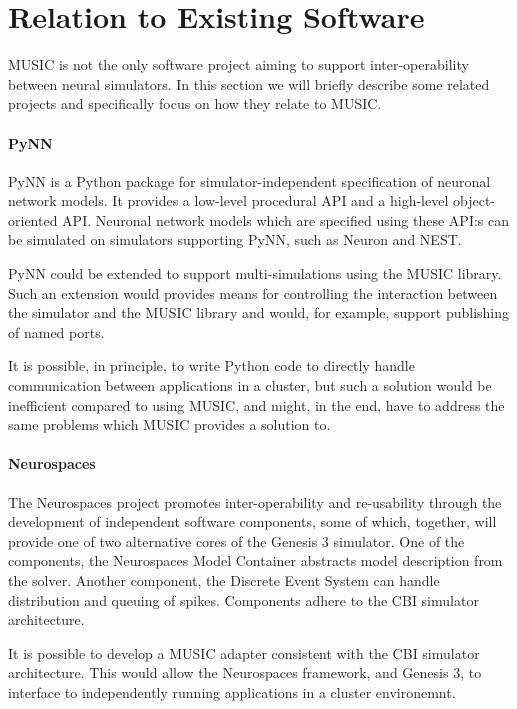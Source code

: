 \documentclass[a4paper]{report}
\begin{document}
\section{Relation to Existing Software}

MUSIC is not the only software project aiming to support
inter-operability between neural simulators.  In this section we will
briefly describe some related projects and specifically focus on how
they relate to MUSIC.

\paragraph{PyNN}

PyNN is a Python package for simulator-independent specification of
neuronal network models.  It provides a low-level procedural API and a
high-level object-oriented API.  Neuronal network models which are
specified using these API:s can be simulated on simulators supporting
PyNN, such as Neuron and NEST.

PyNN could be extended to support multi-simulations using the MUSIC
library.  Such an extension would provides means for controlling the
interaction between the simulator and the MUSIC library and would, for
example, support publishing of named ports.

It is possible, in principle, to write Python code to directly handle
communication between applications in a cluster, but such a solution
would be inefficient compared to using MUSIC, and might, in the end,
have to address the same problems which MUSIC provides a solution to.

\paragraph{Neurospaces}

The Neurospaces project promotes inter-operability and re-usability
through the development of independent software components, some of
which, together, will provide one of two alternative cores of the
Genesis 3 simulator.  One of the components, the Neurospaces Model
Container abstracts model description from the solver.  Another
component, the Discrete Event System can handle distribution and
queuing of spikes.  Components adhere to the CBI simulator
architecture.

It is possible to develop a MUSIC adapter consistent with the CBI
simulator architecture.  This would allow the Neurospaces framework,
and Genesis 3, to interface to independently running applications in a
cluster environemnt.
\end{document}
